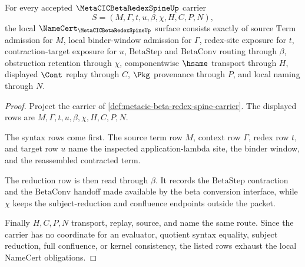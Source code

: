 \begin{theorem}
\label{thm:metacic-beta-redex-spine-namecert-obligations}
For every accepted $\MetaCICBetaRedexSpineUp$ carrier
$$
S=(M,\Gamma,t,u,\beta,\chi,H,C,P,N),
$$
the local $\NameCert_{\MetaCICBetaRedexSpineUp}$ surface consists exactly of source $\mathrm{Term}$ admission for $M$, local binder-window admission for $\Gamma$, redex-site exposure for $t$, contraction-target exposure for $u$, $\mathrm{BetaStep}$ and $\mathrm{BetaConv}$ routing through $\beta$, obstruction retention through $\chi$, componentwise $\hsame$ transport through $H$, displayed $\Cont$ replay through $C$, $\Pkg$ provenance through $P$, and local naming through $N$.
\end{theorem}
\begin{proof}
Project the carrier of \autoref{def:metacic-beta-redex-spine-carrier}. The displayed rows are $M,\Gamma,t,u,\beta,\chi,H,C,P,N$.

The syntax rows come first. The source term row $M$, context row $\Gamma$, redex row $t$, and target row $u$ name the inspected application-lambda site, the binder window, and the reassembled contracted term.

The reduction row is then read through $\beta$. It records the $\mathrm{BetaStep}$ contraction and the $\mathrm{BetaConv}$ handoff made available by the beta conversion interface, while $\chi$ keeps the subject-reduction and confluence endpoints outside the packet.

Finally $H,C,P,N$ transport, replay, source, and name the same route. Since the carrier has no coordinate for an evaluator, quotient syntax equality, subject reduction, full confluence, or kernel consistency, the listed rows exhaust the local NameCert obligations.
\end{proof}


